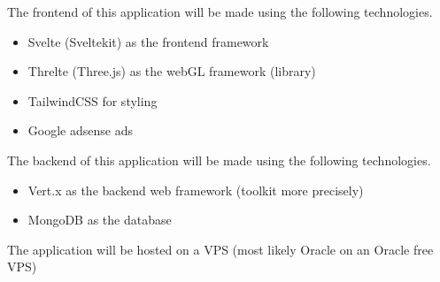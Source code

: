 \documentclass[12pt]{article}
\begin{document}
The frontend of this application will be made using the following technologies.\\
\begin{itemize}
    \item Svelte (Sveltekit) as the frontend framework
    \item Threlte (Three.js) as the webGL framework (library)
    \item TailwindCSS for styling
    \item Google adsense ads
\end{itemize}
The backend of this application will be made using the following technologies.\\
\begin{itemize}
    \item Vert.x as the backend web framework (toolkit more precisely)
    \item MongoDB as the database
\end{itemize}
The application will be hosted on a VPS (most likely Oracle on an Oracle free VPS)
\end{document}
